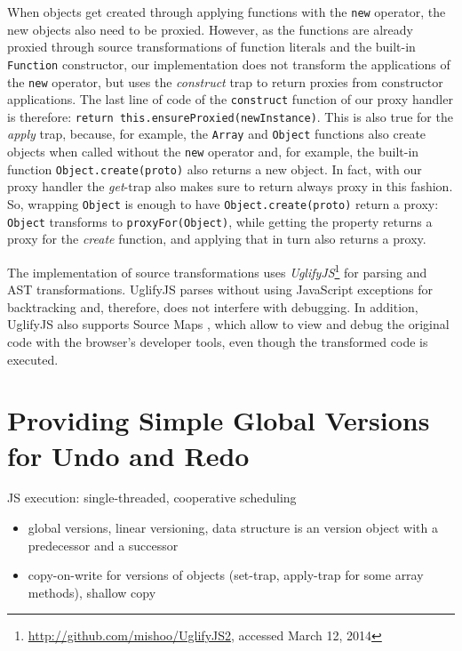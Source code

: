 When objects get created through applying functions with the \lstinline{new} operator, the new objects also need to be proxied.
However, as the functions are already proxied through source transformations of function literals and the built-in \lstinline{Function} constructor, our implementation does not transform the applications of the \lstinline{new} operator, but uses the \emph{construct} trap to return proxies from constructor applications.
The last line of code of the \lstinline{construct} function of our proxy handler is therefore: \lstinline{return this.ensureProxied(newInstance)}.
This is also true for the \emph{apply} trap, because, for example, the \lstinline{Array} and \lstinline{Object} functions also create objects when called without the \lstinline{new} operator and, for example, the built-in function \lstinline{Object.create(proto)} also returns a new object.
In fact, with our proxy handler the \emph{get}-trap also makes sure to return always proxy in this fashion.
So, wrapping \lstinline{Object} is enough to have \lstinline{Object.create(proto)} return a proxy: \lstinline{Object} transforms to \lstinline{proxyFor(Object)}, while getting the property returns a proxy for the \emph{create} function, and applying that in turn also returns a proxy.

The implementation of source transformations uses \emph{UglifyJS}\footnote{\url{http://github.com/mishoo/UglifyJS2}, accessed March 12, 2014} for parsing and AST transformations.
UglifyJS parses without using JavaScript exceptions for backtracking and, therefore, does not interfere with debugging.
In addition, UglifyJS also supports Source Maps , which allow to view and debug the original code with the browser's developer tools, even though the transformed code is executed.



\section{Providing Simple Global Versions for Undo and Redo}

JS execution: single-threaded, cooperative scheduling 

\begin{itemize}
    \item global versions, linear versioning, data structure is an version object with a predecessor and a successor
    \item copy-on-write for versions of objects (set-trap, apply-trap for some array methods), shallow copy
\end{itemize}


